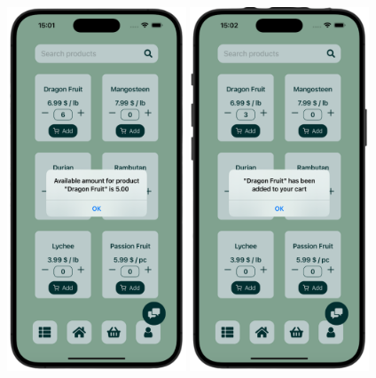 \begin{center} 
    \includegraphics[width=0.4\textwidth]{images/front/products_amount.png}  
    \includegraphics[width=0.4\textwidth]{images/front/products_added.png}  
\end{center}

